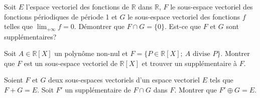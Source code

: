 \documentclass{book}
\begin{document}
\begin{Exercice}
Soit $E$ l'espace vectoriel des fonctions de $\mathbb R$ dans $\mathbb R$, $F$ le sous-espace vectoriel des fonctions périodiques de période 1 et $G$ le sous-espace vectoriel des fonctions $f$ telles que $\lim_{+\infty}f=0$. Démontrer que $F\cap G=\{0\}$. Est-ce que $F$ et $G$ sont supplémentaires?
\end{Exercice}

\begin{Exercice}
Soit $A\in\mathbb R[X]$ un polynôme non-nul et $F=\{P\in\mathbb R[X];\ A\textrm{ divise }P\}$.
Montrer que $F$ est un sous-espace vectoriel de $\mathbb R[X]$ et trouver un supplémentaire à $F$.
\end{Exercice}

\begin{Exercice}
Soient $F$ et $G$ deux sous-espaces vectoriels d'un espace vectoriel $E$ tels que
$F+G=E$. Soit $F'$ un supplémentaire de $F\cap G$ dans $F$. Montrer que
$F'\oplus G=E$.
\end{Exercice}
\end{document}
